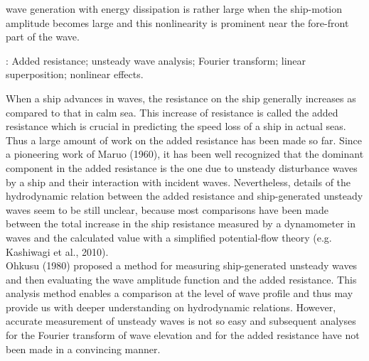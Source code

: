 \documentclass[11pt,fleqn,a3]{article}
\begin{document}
wave generation with energy dissipation is rather large when 
the ship-motion amplitude becomes large and this nonlinearity is
prominent near the fore-front part of the wave.
\footnotesize
\par\bigskip{}:
Added resistance; unsteady wave analysis; Fourier transform; 
linear superposition; nonlinear effects.
%
\par\vspace*{2mm}%
When a ship advances in waves, the resistance on the ship generally increases 
as compared to that in calm sea. This increase of resistance is called 
the added resistance which is crucial in predicting the speed loss of 
a ship in actual seas.
Thus a large amount of work on the added resistance has been made so far. 
Since a pioneering work of Maruo (1960), it has been well recognized that 
the dominant component in the added resistance is the one due to 
unsteady disturbance waves by a ship and their interaction with incident 
waves. Nevertheless, details of the hydrodynamic relation 
between the added resistance and ship-generated unsteady waves 
seem to be still unclear, because most comparisons have been made between 
the total increase in the ship resistance measured by a dynamometer 
in waves and the calculated value with a simplified potential-flow 
theory (e.\hs g. Kashiwagi et al., 2010).
\\

Ohkusu (1980) proposed a method for measuring ship-generated unsteady waves 
and then evaluating the wave amplitude function and the added resistance.
This analysis method enables a comparison at the level of wave 
profile and thus may provide us with deeper understanding on hydrodynamic relations.
However, accurate measurement of unsteady waves is not so easy and 
subsequent analyses for the Fourier transform of wave elevation and for 
the added resistance have not been made in a convincing manner.
\\
\end{document}

